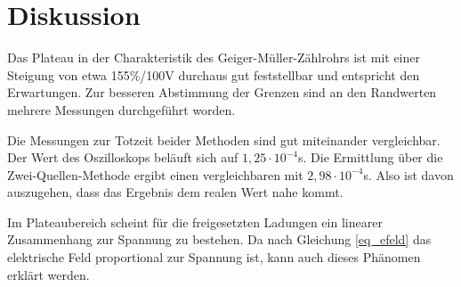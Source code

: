 \section{Diskussion}
Das Plateau in der Charakteristik des Geiger-Müller-Zählrohrs ist mit einer Steigung von etwa 155\%/100V durchaus gut feststellbar
und entspricht den Erwartungen. Zur besseren Abstimmung der Grenzen sind an den Randwerten mehrere Messungen durchgeführt worden.

Die Messungen zur Totzeit beider Methoden sind gut miteinander vergleichbar. Der Wert des Oszilloskops beläuft sich auf
$1,25 \cdot 10^{-4}$s. Die Ermittlung über die Zwei-Quellen-Methode ergibt einen vergleichbaren mit $2,98 \cdot 10^{-4}$s. Also ist
davon auszugehen, dass das Ergebnis dem realen Wert nahe kommt.

Im Plateaubereich scheint für die freigesetzten Ladungen ein linearer Zusammenhang zur Spannung zu bestehen. Da nach Gleichung \eqref{eq_efeld}
das elektrische Feld proportional zur Spannung ist, kann auch dieses Phänomen erklärt werden.



